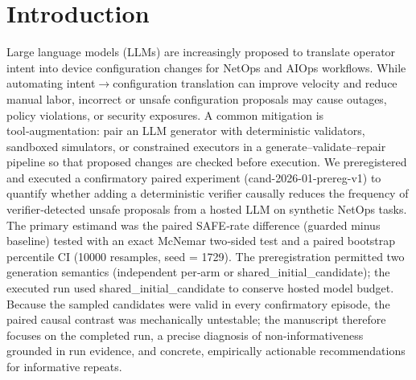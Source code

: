 \documentclass[conference]{IEEEtran}
\begin{document}
\section{Introduction}
Large language models (LLMs) are increasingly proposed to translate operator intent into device configuration changes for NetOps and AIOps workflows. While automating intent\ensuremath{\rightarrow}configuration translation can improve velocity and reduce manual labor, incorrect or unsafe configuration proposals may cause outages, policy violations, or security exposures. A common mitigation is tool‑augmentation: pair an LLM generator with deterministic validators, sandboxed simulators, or constrained executors in a generate--validate--repair pipeline so that proposed changes are checked before execution. We preregistered and executed a confirmatory paired experiment (cand-2026-01-prereg-v1) to quantify whether adding a deterministic verifier causally reduces the frequency of verifier‑detected unsafe proposals from a hosted LLM on synthetic NetOps tasks. The primary estimand was the paired SAFE‑rate difference (guarded minus baseline) tested with an exact McNemar two‑sided test and a paired bootstrap percentile CI (10000 resamples, seed = 1729). The preregistration permitted two generation semantics (independent per‑arm or shared\_initial\_candidate); the executed run used shared\_initial\_candidate to conserve hosted model budget. Because the sampled candidates were valid in every confirmatory episode, the paired causal contrast was mechanically untestable; the manuscript therefore focuses on the completed run, a precise diagnosis of non‑informativeness grounded in run evidence, and concrete, empirically actionable recommendations for informative repeats.
\end{document}
